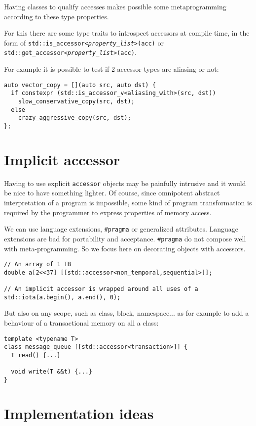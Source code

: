 \documentclass[a4paper]{article}
\begin{document}
Having classes to qualify accesses makes possible some metaprogramming
according to these type properties.

For this there are some type traits to introspect accessors at compile
time, in the form of
\texttt{std::is\_accessor<\emph{property\_list}>(acc)} or
\texttt{std::get\_accessor<\emph{property\_list}>(acc)}.

For example it is possible to test if 2 accessor types are aliasing or
not:
\begin{lstlisting}
auto vector_copy = [](auto src, auto dst) {
  if constexpr (std::is_accessor_v<aliasing_with>(src, dst))
    slow_conservative_copy(src, dst);
  else
    crazy_aggressive_copy(src, dst);
};
\end{lstlisting}


\section{Implicit accessor}
\label{sec:implicit-accessor}

Having to use explicit \texttt{accessor} objects may be painfully
intrusive and it would be nice to have something lighter. Of course,
since omnipotent abstract interpretation of a program is impossible,
some kind of program transformation is required by the programmer to
express properties of memory access.

We can use language extensions, \lstinline|#pragma| or generalized
attributes. Language extensions are bad for portability and
acceptance. \lstinline|#pragma| do not compose well with
meta-programming. So we focus here on decorating objects with
accessors.

\begin{lstlisting}
// An array of 1 TB
double a[2<<37] [[std::accessor<non_temporal,sequential>]];

// An implicit accessor is wrapped around all uses of a
std::iota(a.begin(), a.end(), 0);
\end{lstlisting}

But also on any scope, such as class, block, namespace... as for
example to add a behaviour of a transactional memory on all a class:
\begin{lstlisting}
template <typename T>
class message_queue [[std::accessor<transaction>]] {
  T read() {...}

  void write(T &&t) {...}
}
\end{lstlisting}


\section{Implementation ideas}
\label{sec:implementation-ideas}
\end{document}
